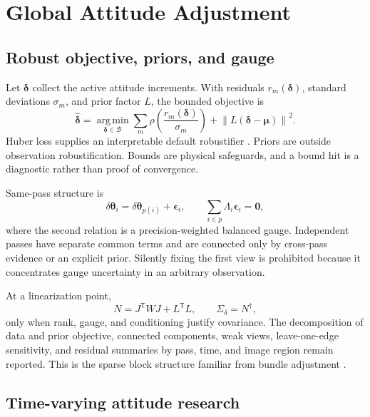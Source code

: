 \documentclass[journal]{IEEEtran}
\newcommand{\T}{^{\mathsf T}}
\newcommand{\norm}[1]{\left\lVert #1\right\rVert}
\newcommand{\argmin}{\operatorname*{arg\,min}}
\begin{document}
\section{Global Attitude Adjustment}

\subsection{Robust objective, priors, and gauge}

Let $\bm\delta$ collect the active attitude increments. With residuals
$r_m(\bm\delta)$, standard deviations $\sigma_m$, and prior factor $L$, the
bounded objective is
\begin{equation}
\widehat{\bm\delta}=\argmin_{\bm\delta\in\mathcal B}
\sum_m \rho\!\left(\frac{r_m(\bm\delta)}{\sigma_m}\right)
+\norm{L(\bm\delta-\bm\mu)}^2.
\label{eq:networkobjective}
\end{equation}
Huber loss supplies an interpretable default robustifier
\cite{Huber1964}. Priors are outside observation robustification. Bounds are
physical safeguards, and a bound hit is a diagnostic rather than proof of
convergence.

Same-pass structure is
\begin{equation}
\delta\bm\theta_i=\delta\bm\theta_{p(i)}+\bm\epsilon_i,
\qquad \sum_{i\in p}\Lambda_i\bm\epsilon_i=\bm0,
\label{eq:passmodel}
\end{equation}
where the second relation is a precision-weighted balanced gauge. Independent
passes have separate common terms and are connected only by cross-pass evidence
or an explicit prior. Silently fixing the first view is prohibited because it
concentrates gauge uncertainty in an arbitrary observation.

At a linearization point,
\begin{equation}
N=J\T WJ+L\T L,\qquad
\Sigma_{\delta}=N^{\dagger},
\label{eq:normal}
\end{equation}
only when rank, gauge, and conditioning justify covariance. The decomposition
of data and prior objective, connected components, weak views, leave-one-edge
sensitivity, and residual summaries by pass, time, and image region remain
reported. This is the sparse block structure familiar from bundle adjustment
\cite{Triggs2000}.

\subsection{Time-varying attitude research}
\end{document}
